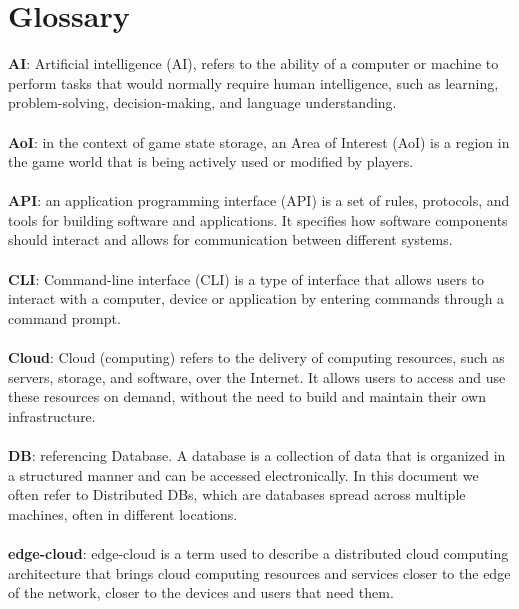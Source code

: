 
\chapter{Glossary}
\textbf{AI}: Artificial intelligence (AI), refers to the ability of a computer or machine to perform tasks that would normally require human intelligence, such as learning, problem-solving, decision-making, and language understanding. 
\\\\
\textbf{AoI}: in the context of game state storage, an Area of Interest (AoI) is a region in the game world that is being actively used or modified by players.
\\\\
\textbf{API}: an application programming interface (API) is a set of rules, protocols, and tools for building software and applications. It specifies how software components should interact and allows for communication between different systems.
\\\\
\textbf{CLI}: Command-line interface (CLI) is a type of interface that allows users to interact with a computer, device or application by entering commands through a command prompt.
\\\\
\textbf{Cloud}: Cloud (computing) refers to the delivery of computing resources, such as servers, storage, and software, over the Internet. It allows users to access and use these resources on demand, without the need to build and maintain their own infrastructure.
\\\\
\textbf{DB}: referencing Database. A database is a collection of data that is organized in a structured manner and can be accessed electronically. In this document we often refer to Distributed DBs, which are databases spread across multiple machines, often in different locations.
\\\\
\textbf{edge-cloud}: edge-cloud is a term used to describe a distributed cloud computing architecture that brings cloud computing resources and services closer to the edge of the network, closer to the devices and users that need them.
\\\\
